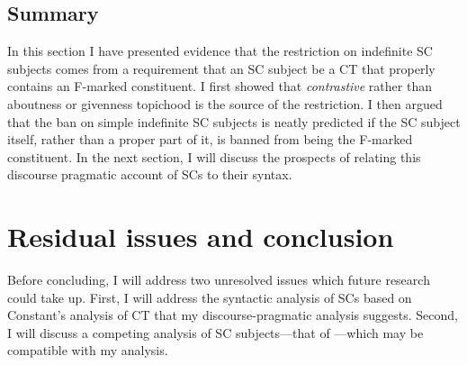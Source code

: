 \documentclass[
	letterpaper,
]{article}
\begin{document}
\subsection{Summary}
In this section I have presented evidence that the restriction on indefinite SC subjects comes from a requirement that an SC subject be a CT that properly contains an F-marked constituent.
I first showed that \textit{contrastive} rather than aboutness or givenness topichood is the source of the restriction.
I then argued that the ban on simple indefinite SC subjects is neatly predicted if the SC subject itself, rather than a proper part of it, is banned from being the F-marked constituent.
In the next section, I will discuss the prospects of relating this discourse pragmatic account of SCs to their syntax.

\section{Residual issues and conclusion}\label{sec:Conclusion}
Before concluding, I will address two unresolved issues which future research could take up.
First, I will address the syntactic analysis of SCs based on Constant's analysis of CT that my discourse-pragmatic analysis suggests.
Second, I will discuss a competing analysis of SC subjects---that of \textcite{romero2005concealed}---which may be compatible with my analysis.
\end{document}
